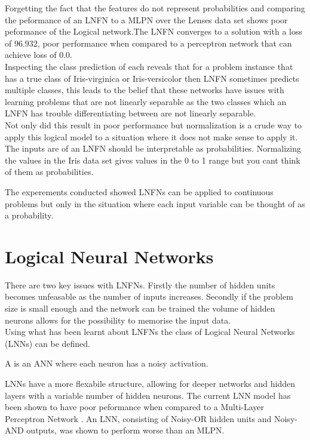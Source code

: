 Forgetting the fact that the features do not represent probabilities and comparing the peformance of an LNFN to a MLPN over the Lenses data set shows poor peformance of the Logical network.The LNFN converges to a solution with a loss of $96.932$, poor performance when compared to a perceptron network that can achieve loss of $0.0$. \\

Inspecting the class prediction of each reveals that for a problem instance that has a true class of Iris-virginica or Iris-versicolor then LNFN sometimes predicts multiple classes, this leads to the belief that these networks have issues with learning problems that are not linearly separable as the two classes which an LNFN has trouble differentiating between are not linearly separable.\\

Not only did this result in poor performance but normalization is a crude way to apply this logical model to a situation where it does not make sense to apply it. The inputs are of an LNFN should be interpretable as probabilities. Normalizing the values in the Iris data set gives values in the 0 to 1 range but you cant think of them as probabilities.

The experements conducted showed LNFNs can be applied to continuous problems but only in the situation where each input variable can be thought of as a probability.

\chapter{Logical Neural Networks} \label{C:lnn}
There are two key issues with LNFNs. Firstly the number of hidden units becomes unfeasable as the number of inputs increases. Secondly if the problem size is small enough and the network can be trained the volume of hidden neurons allows for the possibility to memorise the input data.\\

Using what has been learnt about LNFNs the class of Logical Neural Networks (LNNs) can be defined.

\begin{definition}
	A  is an ANN where each neuron has a noisy activation.
\end{definition}

LNNs have a more flexabile structure, allowing for deeper networks and hidden layers with a variable number of hidden neurons. The current LNN model has been shown to have poor peformance when compared to a Multi-Layer Perceptron Network \cite{LearningLogicalActivations}. An LNN, consisting of Noisy-OR hidden units and Noisy-AND outputs, was shown to perform worse than an MLPN. 

